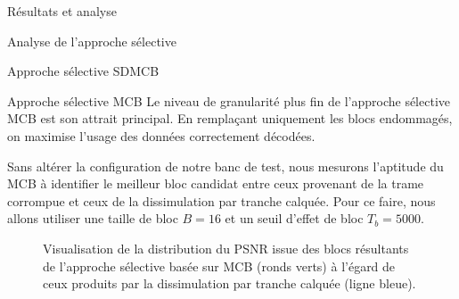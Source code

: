 \documentclass[letterpaper, twoside, 12pt,memoire]{thETS}
\newcommand{\SC}[1]{%
	{
	\todo[inline,color={red!100!green!33}]{%
	\textbf{[SC]:}~#1}
	}}
\providecommand{\DIFaddbegin}{} %
\providecommand{\DIFaddend}{} %
\begin{document}
\begin{chapter}{Résultats et analyse}
\begin{section}{Analyse de l'approche sélective}
\begin{subsection}{Approche sélective SDMCB}
\end{subsection}
\begin{subsection}{Approche sélective MCB}
\label{sec-AnalyseMCB}
Le niveau de granularité plus fin de l’approche sélective MCB est son attrait
principal. En remplaçant uniquement les blocs endommagés, on maximise l’usage
des données correctement décodées.

Sans altérer la configuration de notre banc de test, nous mesurons l'aptitude du
MCB à identifier le meilleur bloc candidat entre ceux provenant de la trame
corrompue et ceux de la dissimulation par tranche calquée. Pour ce faire, nous
allons utiliser une taille de bloc $B=16$ et un seuil d'effet de bloc $T_b =
5000$.

\begin{figure}[htb]
\caption{Visualisation de la distribution du PSNR issue des blocs résultants de
l'approche sélective basée sur MCB (ronds verts) à l'égard de ceux produits par
la dissimulation par tranche calquée (ligne bleue).}
\label{fig-SelectiveSliceCopyBlocks}
\end{figure}
\DIFaddbegin \SC{vert ou turquoise/cyan?}
\DIFaddend 


\end{subsection}
\end{section}
\end{chapter}
\end{document}
